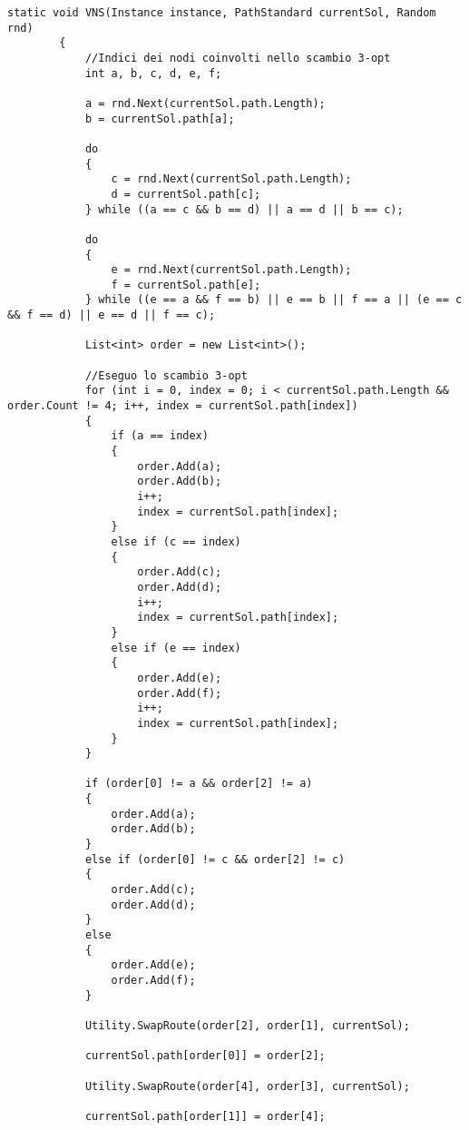 \begin{lstlisting}
static void VNS(Instance instance, PathStandard currentSol, Random rnd)
        {
        	//Indici dei nodi coinvolti nello scambio 3-opt
            int a, b, c, d, e, f;

            a = rnd.Next(currentSol.path.Length);
            b = currentSol.path[a];

            do
            {
                c = rnd.Next(currentSol.path.Length);
                d = currentSol.path[c];
            } while ((a == c && b == d) || a == d || b == c);

            do
            {
                e = rnd.Next(currentSol.path.Length);
                f = currentSol.path[e];
            } while ((e == a && f == b) || e == b || f == a || (e == c && f == d) || e == d || f == c);

            List<int> order = new List<int>();
			
			//Eseguo lo scambio 3-opt
            for (int i = 0, index = 0; i < currentSol.path.Length && order.Count != 4; i++, index = currentSol.path[index])
            {
                if (a == index)
                {
                    order.Add(a);
                    order.Add(b);
                    i++;
                    index = currentSol.path[index];
                }
                else if (c == index)
                {
                    order.Add(c);
                    order.Add(d);
                    i++;
                    index = currentSol.path[index];
                }
                else if (e == index)
                {
                    order.Add(e);
                    order.Add(f);
                    i++;
                    index = currentSol.path[index];
                }
            }

            if (order[0] != a && order[2] != a)
            {
                order.Add(a);
                order.Add(b);
            }
            else if (order[0] != c && order[2] != c)
            {
                order.Add(c);
                order.Add(d);
            }
            else
            {
                order.Add(e);
                order.Add(f);
            }

            Utility.SwapRoute(order[2], order[1], currentSol);

            currentSol.path[order[0]] = order[2];

            Utility.SwapRoute(order[4], order[3], currentSol);

            currentSol.path[order[1]] = order[4];


\end{lstlisting}
